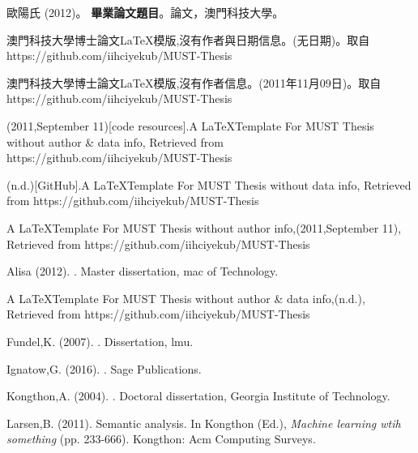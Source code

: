 \begin{thebibliography}{}
歐陽氏 (2012)。
\newblock \textbf{畢業論文題目}。論文，澳門科技大學。

澳門科技大學博士論文\LaTeX 模版,沒有作者與日期信息。(无日期)。取自 https://github.com/iihciyekub/MUST-Thesis

澳門科技大學博士論文\LaTeX 模版,沒有作者信息。(2011年11月09日)。取自 https://github.com/iihciyekub/MUST-Thesis


\iiname(2011,September 11)[code resources].A \LaTeX Template For MUST Thesis without author \& data info, Retrieved from https://github.com/iihciyekub/MUST-Thesis

\iiname(n.d.)[GitHub].A \LaTeX Template For MUST Thesis without data info, Retrieved from https://github.com/iihciyekub/MUST-Thesis

A \LaTeX Template For MUST Thesis without author info,(2011,September 11), Retrieved from https://github.com/iihciyekub/MUST-Thesis

Alisa (2012).
. Master dissertation,  mac of Technology.

A \LaTeX Template For MUST Thesis without author \& data info,(n.d.), Retrieved from https://github.com/iihciyekub/MUST-Thesis

Fundel,K. (2007).
. Dissertation, lmu.

Ignatow,G. (2016).
. Sage Publications.

Kongthon,A. (2004).
. Doctoral dissertation, Georgia Institute of Technology.

Larsen,B. (2011).
\newblock  Semantic analysis. In Kongthon (Ed.), {\em Machine learning wtih something} (pp. 233-666). Kongthon: Acm Computing Surveys.


\end{thebibliography}
